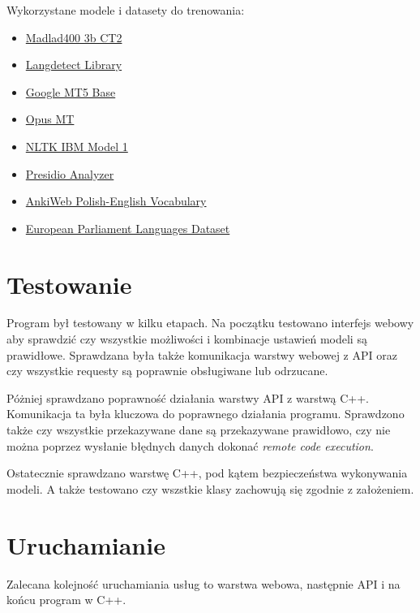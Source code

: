 \documentclass{article}
\begin{document}
\noindent Wykorzystane modele i datasety do trenowania:
\begin{itemize}
  \item \href{https://huggingface.co/santhosh/madlad400-3b-ct2}{Madlad400 3b CT2}
  \item \href{https://github.com/Mimino666/langdetect}{Langdetect Library}
  \item \href{https://huggingface.co/google/mt5-base}{Google MT5 Base}
  \item \href{https://huggingface.co/jproboszcz/opus-mt-en-pl}{Opus MT}
  \item \href{https://www.nltk.org/_modules/nltk/translate/ibm1.html}{NLTK IBM Model 1}
  \item \href{https://microsoft.github.io/presidio/analyzer/}{Presidio Analyzer}
  \item \href{https://www.kaggle.com/datasets/martininf1n1ty/ankiweb-polish-english}{AnkiWeb Polish-English Vocabulary}
  \item \href{https://www.kaggle.com/datasets/ahmadiub/languages-dataset}{European Parliament Languages Dataset}
\end{itemize} 

\section{Testowanie}

Program był testowany w kilku etapach. Na początku testowano interfejs webowy aby sprawdzić czy wszystkie możliwości i kombinacje ustawień modeli są prawidłowe. Sprawdzana była także komunikacja warstwy webowej z API oraz czy wszystkie requesty są poprawnie obsługiwane lub odrzucane.

Póżniej sprawdzano poprawność działania warstwy API z warstwą C++. Komunikacja ta była kluczowa do poprawnego działania programu. Sprawdzono także czy wszystkie przekazywane dane są przekazywane prawidłowo, czy nie można poprzez wysłanie błędnych danych dokonać \textit{remote code execution}.

Ostatecznie sprawdzano warstwę C++, pod kątem bezpieczeństwa wykonywania modeli. A także testowano czy wszstkie klasy zachowują się zgodnie z założeniem.

\section{Uruchamianie}

Zalecana kolejność uruchamiania usług to warstwa webowa, następnie API i na końcu program w C++.
\end{document}

